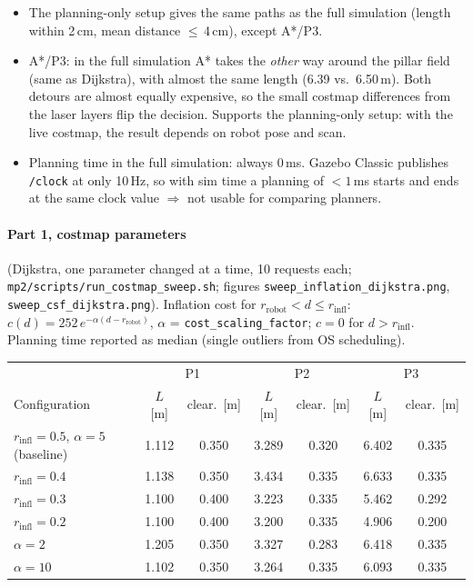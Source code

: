 \documentclass[10pt]{article}
\newcommand{\pkg}[1]{\texttt{#1}}
\begin{document}
\begin{itemize}
  \item The planning-only setup gives the same paths as the full simulation (length within 2\,cm, mean distance
        $\le$\,4\,cm), except A*/P3.
  \item A*/P3: in the full simulation A* takes the \emph{other} way around the pillar field (same as Dijkstra), with
        almost the same length (6.39 vs.\ 6.50\,m). Both detours are almost equally expensive, so the small costmap
        differences from the laser layers flip the decision. Supports the planning-only setup: with the live costmap,
        the result depends on robot pose and scan.
  \item Planning time in the full simulation: always 0\,ms. Gazebo Classic publishes \pkg{/clock} at only 10\,Hz,
        so with sim time a planning of $<1$\,ms starts and ends at the same clock value
        $\Rightarrow$ not usable for comparing planners.
\end{itemize}

\paragraph{Part 1, costmap parameters} (Dijkstra, one parameter changed at a time, 10 requests each;
\pkg{mp2/scripts/run\_costmap\_sweep.sh}; figures \pkg{sweep\_inflation\_dijkstra.png}, \pkg{sweep\_csf\_dijkstra.png}).
Inflation cost for $r_\text{robot} < d \le r_\text{infl}$: $c(d) = 252\, e^{-\alpha (d - r_\text{robot})}$,
$\alpha$ = \pkg{cost\_scaling\_factor}; $c = 0$ for $d > r_\text{infl}$.
Planning time reported as median (single outliers from OS scheduling).

\begin{tabular}{lcccccc}
\toprule
 & \multicolumn{2}{c}{P1} & \multicolumn{2}{c}{P2} & \multicolumn{2}{c}{P3} \\
Configuration & $L$ [m] & clear.\ [m] & $L$ [m] & clear.\ [m] & $L$ [m] & clear.\ [m] \\
\midrule
$r_\text{infl}=0.5$, $\alpha=5$ (baseline) & 1.112 & 0.350 & 3.289 & 0.320 & 6.402 & 0.335 \\
$r_\text{infl}=0.4$ & 1.138 & 0.350 & 3.434 & 0.335 & 6.633 & 0.335 \\
$r_\text{infl}=0.3$ & 1.100 & 0.400 & 3.223 & 0.335 & 5.462 & 0.292 \\
$r_\text{infl}=0.2$ & 1.100 & 0.400 & 3.200 & 0.335 & 4.906 & 0.200 \\
$\alpha=2$  & 1.205 & 0.350 & 3.327 & 0.283 & 6.418 & 0.335 \\
$\alpha=10$ & 1.102 & 0.350 & 3.264 & 0.335 & 6.093 & 0.335 \\
\bottomrule
\end{tabular}
\end{document}
